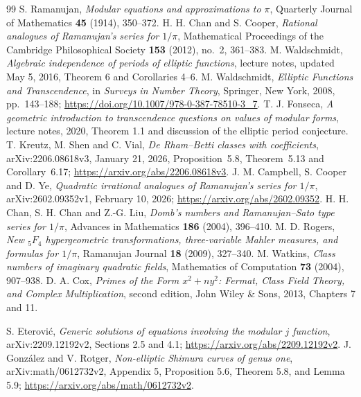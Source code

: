 \begin{thebibliography}{99}
 S. Ramanujan,
\emph{Modular equations and approximations to $\pi$},
Quarterly Journal of Mathematics \textbf{45} (1914), 350--372.
 H. H. Chan and S. Cooper,
\emph{Rational analogues of Ramanujan's series for $1/\pi$},
Mathematical Proceedings of the Cambridge Philosophical Society
\textbf{153} (2012), no.~2, 361--383.
 M. Waldschmidt,
\emph{Algebraic independence of periods of elliptic functions},
lecture notes, updated May 5, 2016, Theorem 6 and Corollaries 4--6.
 M. Waldschmidt,
\emph{Elliptic Functions and Transcendence}, in
\emph{Surveys in Number Theory}, Springer, New York, 2008,
pp.~143--188;
\url{https://doi.org/10.1007/978-0-387-78510-3_7}.
 T. J. Fonseca,
\emph{A geometric introduction to transcendence questions on values of
modular forms}, lecture notes, 2020, Theorem 1.1 and discussion of the
elliptic period conjecture.
 T. Kreutz, M. Shen and C. Vial,
\emph{De Rham--Betti classes with coefficients},
arXiv:2206.08618v3, January 21, 2026,
Proposition~5.8, Theorem~5.13 and Corollary~6.17;
\url{https://arxiv.org/abs/2206.08618v3}.
 J. M. Campbell, S. Cooper and D. Ye,
\emph{Quadratic irrational analogues of Ramanujan's series for $1/\pi$},
arXiv:2602.09352v1, February 10, 2026;
\url{https://arxiv.org/abs/2602.09352}.
 H. H. Chan, S. H. Chan and Z.-G. Liu,
\emph{Domb's numbers and Ramanujan--Sato type series for $1/\pi$},
Advances in Mathematics \textbf{186} (2004), 396--410.
 M. D. Rogers,
\emph{New ${}_5F_4$ hypergeometric transformations, three-variable
Mahler measures, and formulas for $1/\pi$},
Ramanujan Journal \textbf{18} (2009), 327--340.
 M. Watkins,
\emph{Class numbers of imaginary quadratic fields},
Mathematics of Computation \textbf{73} (2004), 907--938.
 D. A. Cox,
\emph{Primes of the Form $x^2+ny^2$: Fermat, Class Field Theory, and
Complex Multiplication}, second edition, John Wiley \& Sons, 2013,
Chapters 7 and 11.
 \raggedright S. Eterovi\'c,
\emph{Generic solutions of equations involving the modular $j$ function},
arXiv:2209.12192v2, Sections 2.5 and 4.1;
\url{https://arxiv.org/abs/2209.12192v2}.
 J. Gonz\'alez and V. Rotger,
\emph{Non-elliptic Shimura curves of genus one},
arXiv:math/0612732v2, Appendix 5, Proposition 5.6, Theorem 5.8,
and Lemma 5.9; \url{https://arxiv.org/abs/math/0612732v2}.



\end{thebibliography}
